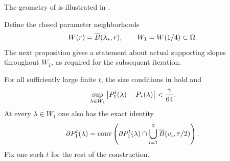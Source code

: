 The geometry of  is illustrated in
.


Define the closed parameter neighborhoods
\begin{equation}
 W(r)=\overline B(\lambda_*,r),\qquad W_1=W(1/4)\subset\Omega.
 \label{i:neighborhoods}
\end{equation}
The next proposition gives a statement about actual supporting slopes
throughout \(W_1\), as required for the subsequent iteration.

\begin{proposition}
\label{i:initial-separation}
For all sufficiently large finite \(t\), the size conditions in
 hold and
\begin{equation}
 \sup_{\lambda\in W_1}\left|P_1^t(\lambda)-P_*(\lambda)\right|
       <\frac{\gamma}{64}.
 \label{i:initial-pressure-error}
\end{equation}
At every \(\lambda\in W_1\) one also has the exact identity
\begin{equation}
 \partial P_1^t(\lambda)
 =\operatorname{conv}\left(
       \partial P_1^t(\lambda)\cap
       \bigcup_{i=1}^3\overline B(v_i,\tau/2)\right).
 \label{i:initial-hull}
\end{equation}
Fix one such \(t\) for the rest of the construction.
\end{proposition}

